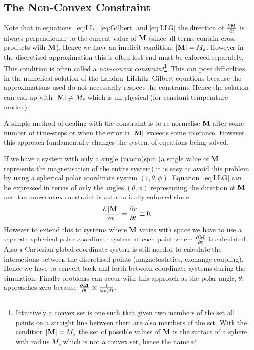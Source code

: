 \subsection{The Non-Convex Constraint}
\label{sec:ensuring-constant-mv}

Note that in equations~\eqref{eq:LL}, \eqref{eq:Gilbert} and \eqref{eq:LLG} the direction of $\frac{\partial \mathbf{M}}{\partial t}$ is always perpendicular to the current value of $\mathbf{M}$ (since all terms contain cross products with $\mathbf{M}$). Hence we have an implicit condition: $\left|{\mathbf{M}} \right| = M_s$. However in the discretised approximation this is often lost and must be enforced separately. This condition is often called a  \emph{non-convex constraint}\footnote{Intuitively a convex set is one such that given two members of the set all points on a straight line between them are also members of the set. With the condition $\left|{\mathbf{M}} \right|=M_s$ the set of possible values of $\mathbf{M}$ is the surface of a sphere with radius $M_s$ which is not a convex set, hence the name.}. This can pose difficulties in the numerical solution of the Landau--Lifshitz--Gilbert equations because the approximations used do not necessarily respect the constraint. Hence the solution can end up with $|\mathbf{M}| \neq M_s$ which is un-physical (for constant temperature models).

A simple method of dealing with the constraint is to re-normalise $\mathbf{M}$ after some number of time-steps or when the error in $|\mathbf{M}|$ exceeds some tolerance.\cite{Fidler2000} However this approach fundamentally changes the system of equations being solved.\cite{Lewis2003}

If we have a system with only a single (macro)spin (\ie a single value of $\mathbf{M}$ represents the magnetisation of the entire system) it is easy to avoid this problem by using a spherical polar coordinate system $(r,\theta,\phi)$. Equation~\eqref{eq:LLG} can be expressed in terms of only the angles $(\theta,\phi)$ representing the direction of $\mathbf{M}$ and the non-convex constraint is automatically enforced since
\begin{equation}
  \label{eq:40}
  \frac{\partial \left|{\mathbf{M}} \right|}{\partial t} = \frac{\partial r}{\partial t} \equiv 0.
\end{equation}
However to extend this to systems where $\mathbf{M}$ varies with space we have to use a separate spherical polar coordinate system at each point where $\frac{\partial \mathbf{M}}{\partial t}$ is calculated. Also a Cartesian global coordinate system is still needed to calculate the interactions between the discretised points (\ie magnetostatics, exchange coupling). Hence we have to convert back and forth between coordinate systems during the simulation.\cite{Scholz2003} Finally problems can occur with this approach as the polar angle, $\theta$, approaches zero because $\frac{\partial \mathbf{M}}{\partial t} \propto \frac{1}{\sin(\theta)}$.\cite{Fukushima2005}

